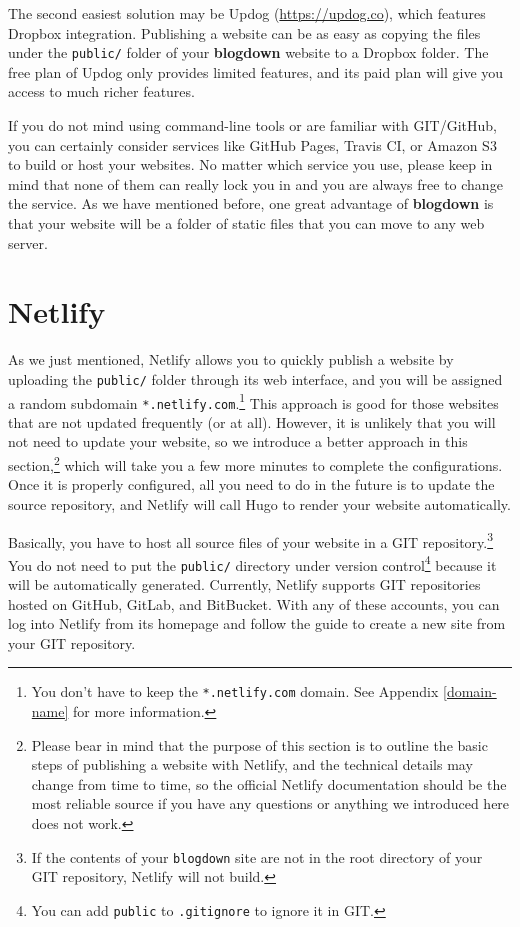 \documentclass[12pt,]{krantz}
\theoremstyle{definition}
\theoremstyle{definition}
\theoremstyle{definition}
\theoremstyle{remark}
\begin{document}
The second easiest solution may be Updog (\url{https://updog.co}), which
features Dropbox integration. Publishing a website can be as easy as
copying the files under the \texttt{public/} folder of your
\textbf{blogdown} website to a Dropbox folder. The free plan of Updog
only provides limited features, and its paid plan will give you access
to much richer features.

If you do not mind using command-line tools or are familiar with
GIT/GitHub, you can certainly consider services like GitHub Pages,
Travis CI, or Amazon S3 to build or host your websites. No matter which
service you use, please keep in mind that none of them can really lock
you in and you are always free to change the service. As we have
mentioned before, one great advantage of \textbf{blogdown} is that your
website will be a folder of static files that you can move to any web
server.

\section{Netlify}\label{netlify}

As we just mentioned, Netlify allows you to quickly
publish a website by uploading the \texttt{public/} folder through its
web interface, and you will be assigned a random subdomain
\texttt{*.netlify.com}.\footnote{You don't have to keep the
  \texttt{*.netlify.com} domain. See Appendix \ref{domain-name} for more
  information.} This approach is good for those websites that are not
updated frequently (or at all). However, it is unlikely that you will
not need to update your website, so we introduce a better approach in
this section,\footnote{Please bear in mind that the purpose of this
  section is to outline the basic steps of publishing a website with
  Netlify, and the technical details may change from time to time, so
  the official Netlify documentation should be the most reliable source
  if you have any questions or anything we introduced here does not
  work.} which will take you a few more minutes to complete the
configurations. Once it is properly configured, all you need to do in
the future is to update the source repository, and Netlify will call
Hugo to render your website automatically.

Basically, you have to host all source files of your website in a GIT
repository.\footnote{If the contents of your \texttt{blogdown} site are
  not in the root directory of your GIT repository, Netlify will not
  build.} You do not need to put the \texttt{public/} directory under
version control\footnote{You can add \texttt{public} to
  \texttt{.gitignore} to ignore it in GIT.} because it will be
automatically generated. Currently, Netlify supports GIT repositories
hosted on GitHub, GitLab, and BitBucket. With any of these accounts, you
can log into Netlify from its homepage and follow the guide to create a
new site from your GIT repository.
\end{document}
